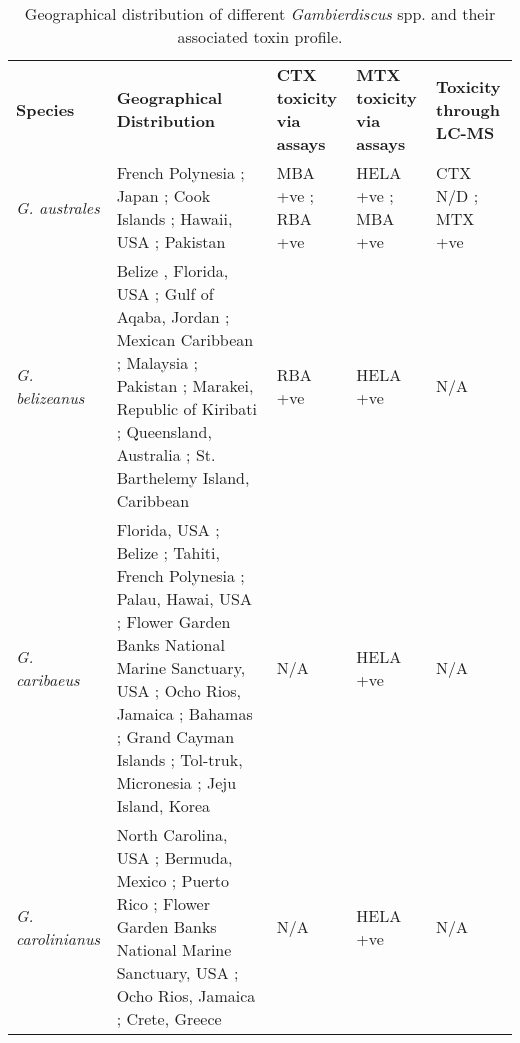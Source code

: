 \documentclass[12pt]{article}
\begin{document}
	
	
	\begin{longtable}{  p{2cm}  p{5.5cm}  p{2.3cm}  p{2.3cm}  p{2.3cm}  }
	\caption{Geographical distribution of different \emph{Gambierdiscus} spp. and their associated toxin profile.} \\
	\label{tbl:GeoTable}
	\textbf{Species} & \textbf{Geographical Distribution} & \textbf{CTX toxicity via assays} & \textbf{MTX toxicity via assays} & \textbf{Toxicity through LC-MS} \\
	\emph{G. australes} & French Polynesia \cite{chinain1999morphology}; Japan \cite{nishimura2013genetic}; Cook Islands \cite{rhodes2010toxic}; Hawaii, USA \cite{litaker2009taxonomy}; Pakistan \cite{munir2011occurrence} & MBA +ve \cite{rhodes2010toxic}; RBA +ve \cite{chinain2010growth} & HELA +ve \cite{holland2013differences}; MBA +ve \cite{rhodes2010toxic} & CTX N/D \cite{}; MTX +ve \cite{}\\
	\emph{G. belizeanus} & Belize \cite{faust1995observation}, Florida, USA \cite{litaker2009taxonomy}; Gulf of Aqaba, Jordan \cite{saburova2013new}; Mexican Caribbean \cite{hernandez2004species}; Malaysia \cite{leaw2011first}; Pakistan \cite{munir2011occurrence}; Marakei, Republic of Kiribati \cite{xu2014distribution}; Queensland, Australia \cite{}; St. Barthelemy Island, Caribbean \cite{litaker2010global} & RBA +ve \cite{chinain2010growth} & HELA +ve \cite{holland2013differences} & N/A \\ %
	\emph{G. caribaeus} & Florida, USA \cite{litaker2009taxonomy}; Belize \cite{litaker2009taxonomy}; Tahiti, French Polynesia \cite{litaker2009taxonomy}; Palau, Hawai, USA \cite{litaker2009taxonomy}; Flower Garden Banks National Marine Sanctuary, USA \cite{holland2013differences}; Ocho Rios, Jamaica \cite{}; Bahamas \cite{litaker2010global}; Grand Cayman Islands \cite{}; Tol-truk, Micronesia \cite{litaker2010global}; Jeju Island, Korea \cite{jeong2012first} & N/A & HELA +ve \cite{holland2013differences} & N/A \\
	\emph{G. carolinianus} & North Carolina, USA \cite{litaker2009taxonomy}; Bermuda, Mexico \cite{litaker2010global}; Puerto Rico \cite{holland2013differences}; Flower Garden Banks National Marine Sanctuary, USA \cite{holland2013differences}; Ocho Rios, Jamaica \cite{holland2013differences}; Crete, Greece \cite{holland2013differences} & N/A & HELA +ve \cite{holland2013differences} & N/A\\

\end{longtable}
\end{document}
